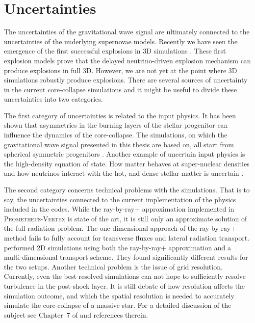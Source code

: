 \section{Uncertainties}
The uncertainties of the gravitational wave signal are ultimately connected to the uncertainties
of the underlying supernovae models. Recently we have seen the emergence of the first successful explosions 
in 3D simulations \citep{melson_15a,melson_15b,lentz_15,suma_models}. 
These first explosion models prove that the delayed neutrino-driven explosion mechanism can produce explosions in full 3D. 
However, we are not yet at the point where 3D simulations robustly produce explosions. 
There are several sources of uncertainty in the current core-collapse simulations and it might be useful to divide these uncertainties into two categories. 

The first category of uncertainties is related to the input physics. 
It has been shown that asymmetries in the burning layers of the stellar progenitor can influence the dynamics of the core-collapse. 
The simulations, on which the gravitational wave signal presented in this thesis are based on, all start from spherical symmetric progenitors
\citep{burrows_96,fryer_04,arnett_11,couch_13,mueller_15a}. 
Another example of uncertain input physics is the high-density equation of state. 
How matter behaves at super-nuclear densities and how neutrinos interact with the hot, and dense 
stellar matter is uncertain \citep{fischer_14,lattimer_16}.

The second category concerns technical problems with the simulations. 
That is to say, the uncertainties connected to the current implementation of the physics included in the codes. 
While the ray-by-ray+ approximation implemented in \textsc{Prometheus-Vertex} \citep{rampp_02} is state of the art, it is still only an approximate
solution of the full radiation problem. The one-dimensional approach of the ray-by-ray+ method fails to fully account for
transverse fluxes and lateral radiation transport. \cite{skinner_16} performed 2D simulations using both the ray-by-ray+ approximation and a multi-dimensional transport scheme. They found significantly different results for the two setups.
Another technical problem is the issue of grid resolution. Currently, even the best resolved simulations can not hope to sufficiently resolve turbulence in the post-shock layer.
It is still debate of how resolution affects the simulation outcome, and
which the spatial resolution is needed to accurately simulate the core-collapse of a massive star. 
For a detailed discussion of the subject see Chapter~7 of \cite{melson_phd} and references therein. 

